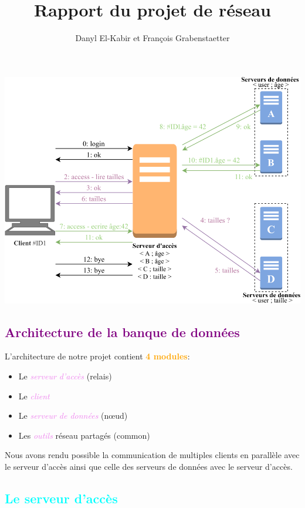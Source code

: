 \documentclass[a4paper]{article}
\title{Rapport du projet de réseau}
\author{Danyl El-Kabir et François Grabenstaetter}
\let\oldsection\section{}
\renewcommand{\section}[1]{\textcolor{purple}{\oldsection{#1}}}
\let\oldsubsection\subsection{}
\renewcommand{\subsection}[1]{\textcolor{cyan}{\oldsubsection{#1}}}
\let\oldtextbf\textbf
\renewcommand{\textbf}[1]{\textcolor{orange}{\oldtextbf{#1}}}
\let\oldtextit\textit
\renewcommand{\textit}[1]{\textcolor{violet}{\oldtextit{#1}}}
\begin{document}
\sffamily
\everymath{\displaystyle}
\setlength\parindent{0mm}
\setlength{\parskip}{0.2cm}
\maketitle

\includegraphics[scale=1.6]{img/enonce.png}

\section{Architecture de la banque de données}

L'architecture de notre projet contient \textbf{4 modules}:
\begin{itemize}
    \item Le \textit{serveur d'accès} (relais)
    \item Le \textit{client}
    \item Le \textit{serveur de données} (nœud)
    \item Les \textit{outils} réseau partagés (common)
\end{itemize}

Nous avons rendu possible la communication de multiples clients en parallèle avec le serveur d'accès ainsi que celle des serveurs de données avec le serveur d'accès.

\subsection{Le serveur d'accès}
\end{document}

